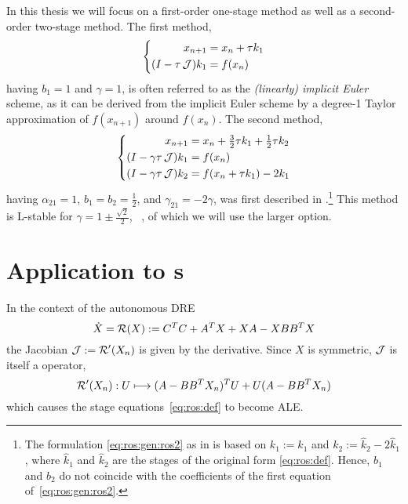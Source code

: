 In this thesis we will focus on a first-order one-stage method as well as a second-order two-stage method.
The first method, 
\begin{equation}
\label{eq:ros:gen:ros1}
\left\{
\begin{aligned}
  x_{n+1} &= x_n + \tau k_1 \\
  (I - \tau \operatorname{\mathcal J}) k_1 &= f(x_n)
\end{aligned}
\right.
\end{equation}
having $b_1=1$ and $\gamma=1$,
is often referred to as the \emph{(linearly) implicit Euler} scheme,
as it can be derived from the implicit Euler scheme
by a degree-1 Taylor approximation of $f(x_{n+1})$ around $f(x_n)$.
The second method, 
\begin{equation}
\label{eq:ros:gen:ros2}
\left\{
\begin{aligned}
  x_{n+1} &= x_n + \tfrac{3}{2} \tau k_1 + \tfrac{1}{2} \tau k_2 \\
  (I - \gamma\tau \operatorname{\mathcal J}) k_1 &= f(x_n) \\
  (I - \gamma\tau \operatorname{\mathcal J}) k_2 &= f(x_n + \tau k_1) - 2k_1
\end{aligned}
\right.
\end{equation}
having $\alpha_{21}=1$, $b_1=b_2=\frac{1}{2}$, and $\gamma_{21}=-2\gamma$,
was first described in \cite{Verwer1999}.\footnote{%
  The formulation \eqref{eq:ros:gen:ros2} as in \cite[Equation~(3.4)]{Verwer1999}
  is based on $k_1 := \hat k_1$ and $k_2 := \hat k_2 - 2 \hat k_1$,
  where $\hat k_1$ and $\hat k_2$ are the stages of the original form \eqref{eq:ros:def}.
  Hence, $b_1$ and $b_2$ do not coincide with the coefficients of the first equation of~\eqref{eq:ros:gen:ros2}.
}
This method is L-stable for $\gamma = 1 \pm \frac{\sqrt{2}}{2}$,
\cf~\cite[Table~6.4]{HairerWanner2},
of which we will use the larger option.

\section{Application to s}

In the context of the autonomous \ac{DRE}
\begin{equation}
\label{eq:ros:DRE}
  \dot X = \operatorname{\mathcal R}(X) :=
  C^T C + A^T X + XA - X BB^T X
\end{equation}
the Jacobian $\operatorname{\mathcal J} := \operatorname{\mathcal R}'(X_n)$ is given by the \Frechet derivative.
Since $X$ is symmetric,
$\operatorname{\mathcal J}$ is itself a \Lyapunov operator,
\begin{equation}
  \operatorname{\mathcal R}'(X_n) : U \longmapsto (A - BB^T X_n)^T U + U (A - BB^T X_n)
\end{equation}
which causes the stage equations~\eqref{eq:ros:def} to become \ac{ALE}.

